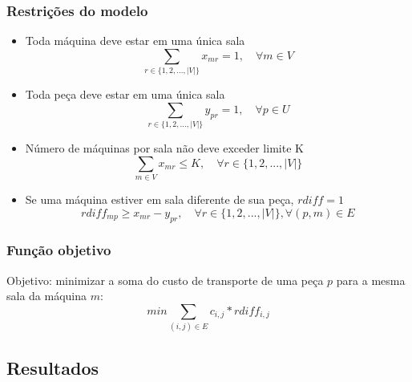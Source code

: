 \documentclass[11pt,letterpaper]{article}
\begin{document}
\subsubsection*{Restrições do modelo}
\begin{itemize}
\item Toda máquina deve estar em uma única sala
  \begin{equation*}
    \sum_{r \in  \{1,2,...,|V|\}}x_{mr}=1,\quad \forall m \in V
  \end{equation*}

\item Toda peça deve estar em uma única sala
  \begin{equation*}
    \sum_{r \in  \{1,2,...,|V|\}}y_{pr}=1, \quad\forall p \in U
  \end{equation*}

\item Número de máquinas por sala não deve exceder limite K
  \begin{equation*}
    \sum_{m \in V }x_{mr}\leq K,\quad \forall r \in \{1,2,...,|V|\}
  \end{equation*}

\item Se uma máquina estiver em sala diferente de sua peça, $rdiff=1$
  \begin{equation*}
    rdiff_{mp}\geq x_{mr}-y_{pr},\quad \forall r \in \{1,2,...,|V|\}, \forall (p,m) \in E
  \end{equation*}

\end{itemize}

\subsubsection*{Função objetivo}
Objetivo: minimizar a soma do custo de transporte de uma peça $p$ para
a mesma sala da máquina $m$:
\begin{equation}
  min\sum_{(i,j) \in E}c_{i,j}*rdiff_{i,j}
\end{equation}



\subsection{Resultados}


\addtocounter{footnote}{1}
\end{document}
